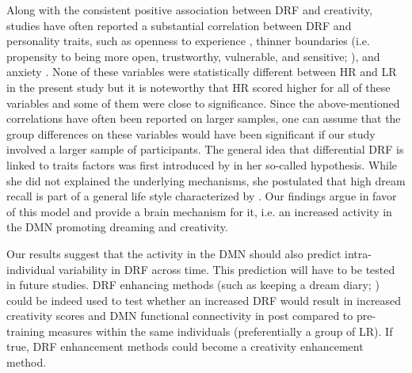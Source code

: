 Along with the consistent positive association between DRF and creativity, studies have often reported a substantial correlation between DRF and personality traits, such as openness to experience \citep{schredl_dream_2003}, thinner boundaries (i.e. propensity to being more open, trustworthy, vulnerable, and sensitive; \citealp{hartmann_boundaries_1989, schredl_dreaming_1996}), and anxiety \citep{schonbar_manifest_1959, tart_frequency_1962}. None of these variables were statistically different between HR and LR in the present study but it is noteworthy that HR scored higher for all of these variables and some of them were close to significance. Since the above-mentioned correlations have often been reported on larger samples, one can assume that the group differences on these variables would have been significant if our study involved a larger sample of participants. The general idea that differential DRF is linked to traits factors was first introduced by \citet{schonbar_differential_1965} in her so-called  hypothesis. While she did not explained the underlying mechanisms, she postulated that high dream recall is part of a general life style characterized by  \citep{schredl_dream_1999}. Our findings argue in favor of this model and provide a brain mechanism for it, i.e. an increased activity in the DMN promoting dreaming and creativity.

Our results suggest that the activity in the DMN should also predict intra-individual variability in DRF across time. This prediction will have to be tested in future studies. DRF enhancing methods (such as keeping a dream diary; \citealp{schredl_questionnaires_2002}) could be indeed used to test whether an increased DRF would result in increased creativity scores and DMN functional connectivity in post compared to pre-training measures within the same individuals (preferentially a group of LR). If true, DRF enhancement methods could become a creativity enhancement method.

%
